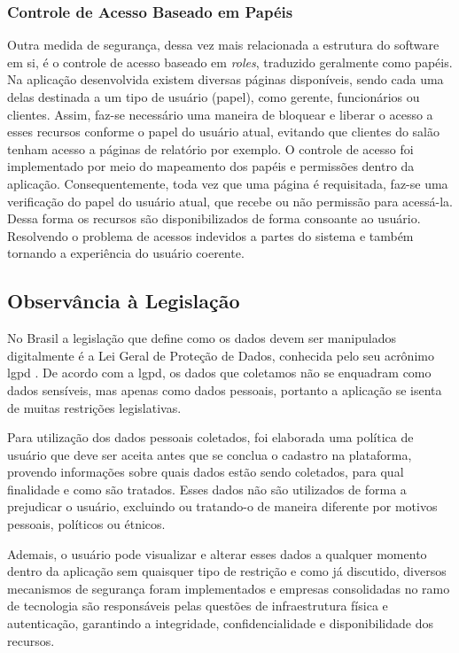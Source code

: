 \subsubsection{Controle de Acesso Baseado em Papéis}
Outra medida de segurança, dessa vez mais relacionada a estrutura do software em si, é o controle de acesso baseado em \textit{roles}, traduzido geralmente como papéis.
Na aplicação desenvolvida existem diversas páginas disponíveis, sendo cada uma delas destinada a um tipo de usuário (papel), como gerente, funcionários ou clientes. Assim, faz-se necessário uma maneira de bloquear e liberar o acesso a esses recursos conforme o papel do usuário atual, evitando que clientes do salão tenham acesso a páginas de relatório por exemplo.
O controle de acesso foi implementado por meio do mapeamento dos papéis e permissões dentro da aplicação. Consequentemente, toda vez que uma página é requisitada, faz-se uma verificação do papel do usuário atual, que recebe ou não permissão para acessá-la.
Dessa forma os recursos são disponibilizados de forma consoante ao usuário. Resolvendo o problema de acessos indevidos a partes do sistema e também tornando a experiência do usuário coerente.

\subsection{Observância à Legislação}
No Brasil a legislação que define como os dados devem ser manipulados digitalmente é a Lei Geral de Proteção de Dados, conhecida pelo seu acrônimo \gls{lgpd} \cite{lgpd}. De acordo com a \gls{lgpd}, os dados que coletamos não se enquadram como dados sensíveis, mas apenas como dados pessoais, portanto a aplicação se isenta de muitas restrições legislativas.

Para utilização dos dados pessoais coletados, foi elaborada uma política de usuário que deve ser aceita antes que se conclua o cadastro na plataforma, provendo informações sobre quais dados estão sendo coletados, para qual finalidade e como são tratados.  Esses dados não são utilizados de forma a prejudicar o usuário, excluindo ou tratando-o de maneira diferente por motivos pessoais, políticos ou étnicos. 

Ademais, o usuário pode visualizar e alterar esses dados a qualquer momento dentro da aplicação sem quaisquer tipo de restrição e como já discutido, diversos mecanismos de segurança foram implementados e empresas consolidadas no ramo de tecnologia são responsáveis pelas questões de infraestrutura física e autenticação, garantindo a integridade, confidencialidade e disponibilidade dos recursos.